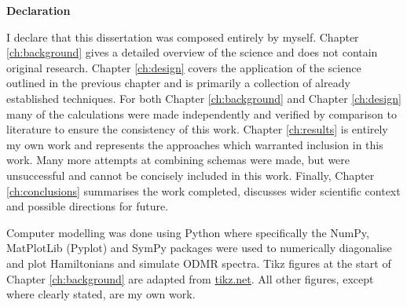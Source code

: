 
\vspace*{\fill}
\begin{center}
\textrm{\bfseries\Huge Declaration}%
\end{center}%
\vspace{1em}

I declare that this dissertation was composed entirely by myself. Chapter \ref{ch:background} gives a detailed overview of the science and does not contain original research. Chapter \ref{ch:design} covers the application of the science outlined in the previous chapter and is primarily a collection of already established techniques. For both Chapter \ref{ch:background} and Chapter \ref{ch:design} many of the calculations were made independently and verified by comparison to literature to ensure the consistency of this work. Chapter \ref{ch:results} is entirely my own work and represents the approaches which warranted inclusion in this work. Many more attempts at combining schemas were made, but were unsuccessful and cannot be concisely included in this work. 
Finally, Chapter \ref{ch:conclusions} summarises the work completed, discusses wider scientific context and possible directions for  
future. 

Computer modelling was done using Python where specifically the NumPy, MatPlotLib (Pyplot) and SymPy packages were used to numerically diagonalise and plot Hamiltonians and simulate ODMR spectra. Tikz figures at the start of Chapter \ref{ch:background} are adapted from \url{tikz.net}. All other figures, except where clearly stated, are my own work.  

%
%
%
%
%
%
\vspace*{\fill}
\newpage
%
%
